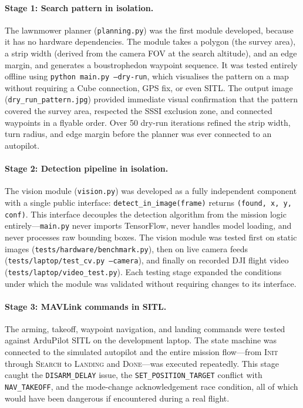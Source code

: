 \paragraph{Stage 1: Search pattern in isolation.}
The lawnmower planner (\texttt{planning.py}) was the first module developed, because it has no hardware dependencies.  The module takes a polygon (the survey area), a strip width (derived from the camera FOV at the search altitude), and an edge margin, and generates a boustrophedon waypoint sequence.  It was tested entirely offline using \texttt{python main.py --dry-run}, which visualises the pattern on a map without requiring a Cube connection, GPS fix, or even SITL.  The output image (\texttt{dry\_run\_pattern.jpg}) provided immediate visual confirmation that the pattern covered the survey area, respected the SSSI exclusion zone, and connected waypoints in a flyable order.  Over 50 dry-run iterations refined the strip width, turn radius, and edge margin before the planner was ever connected to an autopilot.

\paragraph{Stage 2: Detection pipeline in isolation.}
The vision module (\texttt{vision.py}) was developed as a fully independent component with a single public interface: \texttt{detect\_in\_image(frame)} returns \texttt{(found, x, y, conf)}.  This interface decouples the detection algorithm from the mission logic entirely---\texttt{main.py} never imports TensorFlow, never handles model loading, and never processes raw bounding boxes.  The vision module was tested first on static images (\texttt{tests/hardware/benchmark.py}), then on live camera feeds (\texttt{tests/laptop/test\_cv.py --camera}), and finally on recorded DJI flight video (\texttt{tests/laptop/video\_test.py}).  Each testing stage expanded the conditions under which the module was validated without requiring changes to its interface.

\paragraph{Stage 3: MAVLink commands in SITL.}
The arming, takeoff, waypoint navigation, and landing commands were tested against ArduPilot SITL on the development laptop.  The state machine was connected to the simulated autopilot and the entire mission flow---from \textsc{Init} through \textsc{Search} to \textsc{Landing} and \textsc{Done}---was executed repeatedly.  This stage caught the \texttt{DISARM\_DELAY} issue, the \texttt{SET\_POSITION\_TARGET} conflict with \texttt{NAV\_TAKEOFF}, and the mode-change acknowledgement race condition, all of which would have been dangerous if encountered during a real flight.

